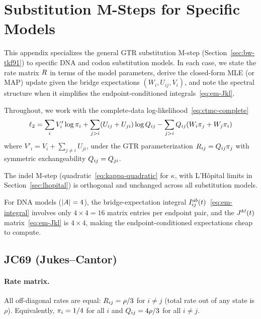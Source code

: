 
\section{Substitution M-Steps for Specific Models}
\label{sec:subst-mstep}

This appendix specializes the general GTR substitution M-step
(Section~\ref{sec:bw-tkf91}) to specific DNA and codon substitution models.
In each case, we state the rate matrix $R$ in terms of the model
parameters, derive the closed-form MLE (or MAP) update given the
bridge expectations $(W_i, U_{ij}, V_i)$,
and note the spectral structure when it simplifies the
endpoint-conditioned integrals~\eqref{eq:em-Jkl}.

Throughout, we work with the complete-data log-likelihood~\eqref{eq:ctmc-complete}
\[
\ell_2 = \sum_i V'_i \log \pi_i
  + \sum_{j>i} (U_{ij} + U_{ji}) \log Q_{ij}
  - \sum_{j>i} Q_{ij}(W_i \pi_j + W_j \pi_i)
\]
where $V'_i = V_i + \sum_{j \neq i} U_{ji}$,
under the GTR parameterization $R_{ij} = Q_{ij} \pi_j$
with symmetric exchangeability $Q_{ij} = Q_{ji}$.

The indel M-step (quadratic~\eqref{eq:kappa-quadratic} for $\kappa$,
with L'H\^opital limits in Section~\ref{sec:lhopital})
is orthogonal and unchanged across all substitution models.

For DNA models ($|A| = 4$), the bridge-expectation integral
$I^{ab}_{ij}(t)$~\eqref{eq:em-integral}
involves only $4 \times 4 = 16$ matrix entries per endpoint pair,
and the $J^{kl}(t)$ matrix~\eqref{eq:em-Jkl}
is $4 \times 4$,
making the endpoint-conditioned expectations cheap to compute.


\subsection{JC69 (Jukes--Cantor)}
\label{sec:mstep-jc69}

\paragraph{Rate matrix.}
All off-diagonal rates are equal:
$R_{ij} = \rho/3$ for $i \neq j$
(total rate out of any state is $\rho$).
Equivalently, $\pi_i = 1/4$ for all $i$
and $Q_{ij} = 4\rho/3$ for all $i \neq j$.

